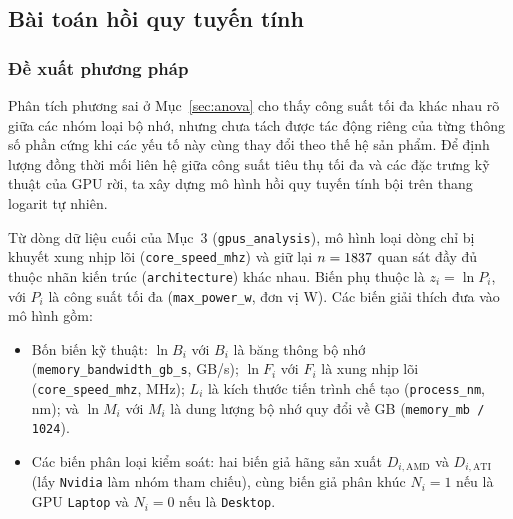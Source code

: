 
\subsection{Bài toán hồi quy tuyến tính}
\label{sec:regression}

\subsubsection{Đề xuất phương pháp}
\label{sec:reg-method}

Phân tích phương sai ở Mục~\ref{sec:anova} cho thấy công suất tối đa khác nhau rõ giữa các nhóm
loại bộ nhớ, nhưng chưa tách được tác động riêng của từng thông số phần cứng khi các yếu tố
này cùng thay đổi theo thế hệ sản phẩm. Để định lượng đồng thời mối liên hệ giữa công suất tiêu
thụ tối đa và các đặc trưng kỹ thuật của GPU rời, ta xây dựng mô hình hồi quy tuyến tính bội
trên thang logarit tự nhiên.

\begin{center}
\end{center}

Từ \RegRowsInput{} dòng dữ liệu cuối của Mục~3 (\texttt{gpus\_analysis}), mô hình loại
\RegRowsExcluded{} dòng chỉ bị khuyết xung nhịp lõi (\texttt{core\_speed\_mhz}) và giữ lại
$n = 1837{}$ quan sát đầy đủ thuộc \RegClusters{} nhãn kiến trúc (\texttt{architecture}) khác
nhau. Biến phụ thuộc là $z_i = \ln P_i$, với $P_i$ là công suất tối đa (\texttt{max\_power\_w},
đơn vị W). Các biến giải thích đưa vào mô hình gồm:
\begin{itemize}
  \item Bốn biến kỹ thuật: $\ln B_i$ với $B_i$ là băng thông bộ nhớ (\texttt{memory\_bandwidth\_gb\_s},
    GB/s); $\ln F_i$ với $F_i$ là xung nhịp lõi (\texttt{core\_speed\_mhz}, MHz); $L_i$ là kích
    thước tiến trình chế tạo (\texttt{process\_nm}, nm); và $\ln M_i$ với $M_i$ là dung lượng
    bộ nhớ quy đổi về GB (\texttt{memory\_mb / 1024}).
  \item Các biến phân loại kiểm soát: hai biến giả hãng sản xuất $D_{i,\mathrm{AMD}}$ và
    $D_{i,\mathrm{ATI}}$ (lấy \texttt{Nvidia} làm nhóm tham chiếu), cùng biến giả phân khúc
    $N_i = 1$ nếu là GPU \texttt{Laptop} và $N_i = 0$ nếu là \texttt{Desktop}.
\end{itemize}

